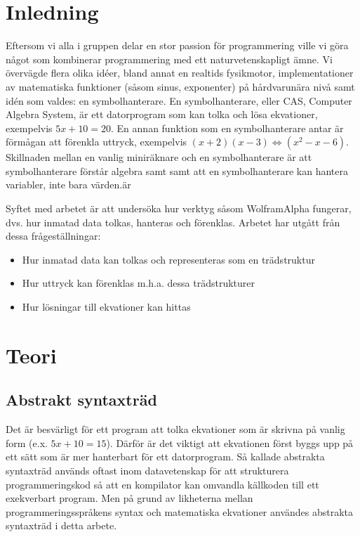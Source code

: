 \documentclass[12pt,a4paper]{article}
\begin{document}
\section{Inledning}
Eftersom vi alla i gruppen delar en stor passion för programmering ville vi göra något som kombinerar programmering med ett naturvetenskapligt ämne. Vi övervägde flera olika idéer, bland annat en realtids fysikmotor, implementationer av matematiska funktioner (såsom sinus, exponenter) på hårdvarunära nivå samt idén som valdes: en symbolhanterare. En symbolhanterare, eller CAS, Computer Algebra System, är ett datorprogram som kan tolka och lösa ekvationer, exempelvis \(5x + 10 = 20\). En annan funktion som en symbolhanterare antar är förmågan att förenkla uttryck, exempelvis \((x + 2)(x - 3) \Leftrightarrow (x^{2} - x - 6)\). Skillnaden mellan en vanlig miniräknare och en symbolhanterare är att symbolhanterare förstår algebra samt samt att en symbolhanterare kan hantera variabler, inte bara värden.är
\par
Syftet med arbetet är att undersöka hur verktyg såsom WolframAlpha fungerar, dvs. hur inmatad data tolkas, hanteras och förenklas. Arbetet har utgått från dessa frågeställningar:
\begin{itemize}
	\item Hur inmatad data kan tolkas och representeras som en trädstruktur
	\item Hur uttryck kan förenklas m.h.a. dessa trädstrukturer
	\item Hur lösningar till ekvationer kan hittas
\end{itemize}
\section{Teori}
\subsection{Abstrakt syntaxträd}
Det är besvärligt för ett program att tolka ekvationer som är skrivna på vanlig form (e.x. \(5x + 10 = 15\)). Därför är det viktigt att ekvationen först byggs upp på ett sätt som är mer hanterbart för ett datorprogram. Så kallade abstrakta syntaxträd används oftast inom datavetenskap för att strukturera programmeringskod så att en kompilator kan omvandla källkoden till ett exekverbart program. Men på grund av likheterna mellan programmeringsspråkens syntax och matematiska ekvationer användes abstrakta syntaxträd i detta arbete.
\end{document}
